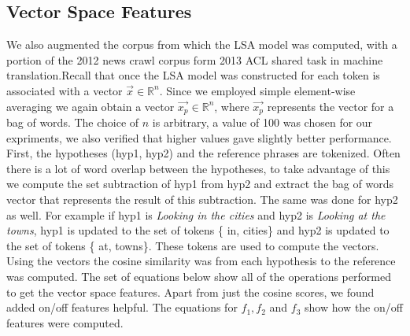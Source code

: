 \documentclass[11pt]{article}
\begin{document}
\subsection{Vector Space Features}
 We also augmented the corpus from which the LSA model was computed,
with a portion of the 2012 news crawl corpus form 2013 ACL shared task in
machine translation.Recall that once the LSA model was constructed for each 
token is associated with a vector $\vec{x}\in \mathbb{R}^n$.
Since we employed simple element-wise averaging we again obtain a vector
$\vec{x_p} \in \mathbb{R}^n$, where $\vec{x_p}$ represents the vector for a bag
of words. The choice of $n$ is arbitrary, a value of 100 was chosen for
our expriments, we also verified that higher values gave slightly better
performance. First, the hypotheses (hyp1, hyp2) and the reference phrases are
tokenized. Often there is a lot of word overlap between the hypotheses, to take
advantage of this we compute the set subtraction of hyp1 from hyp2 and extract
the bag of words vector that represents the result of this subtraction. The same
was done for hyp2 as well. For example if hyp1 is \emph{Looking in the cities}
and hyp2 is \emph{Looking at the towns}, hyp1 is updated to the set of tokens \{
in, cities\} and hyp2 is updated to the set of tokens \{ at, towns\}. These
tokens are used to compute the vectors. Using the vectors the cosine similarity
was from each hypothesis to the reference was computed. The set of equations
below show all of the operations performed to get the vector space features.
Apart from just the cosine scores, we found added on/off features helpful. The
equations for $f_1, f_2$ and $f_3$ show how the on/off features were computed.
\end{document}
